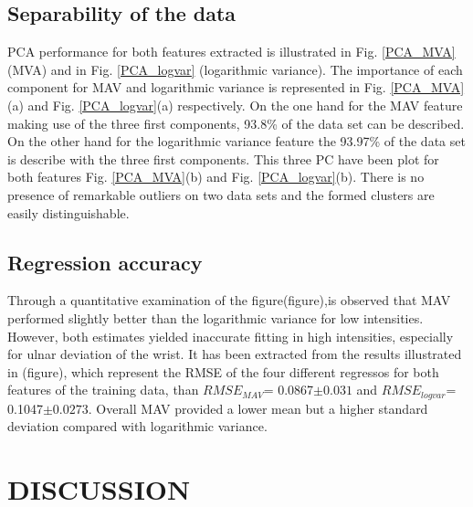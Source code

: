 \documentclass[a4paper, 10pt, conference]{ieeeconf}      %
\begin{document}
	\subsection{Separability of the data} 
	PCA performance for both features extracted is illustrated in Fig. \ref{PCA_MVA} (MVA) and in Fig. \ref{PCA_logvar} (logarithmic variance).
	The importance of each component for MAV and logarithmic variance is represented in Fig. \ref{PCA_MVA}(a) and Fig. \ref{PCA_logvar}(a) respectively. On the one hand for the MAV feature making use of the three first components, 93.8\% of the data set can be described. On the other hand for the logarithmic variance feature the 93.97\% of the data set is describe with the three first components. This three PC have been plot for both features Fig. \ref{PCA_MVA}(b) and Fig. \ref{PCA_logvar}(b). There is no presence of remarkable outliers on two data sets and the formed clusters are easily distinguishable.


	\subsection{Regression accuracy} 
Through a quantitative examination of the figure(figure),is observed that MAV performed slightly better than the logarithmic variance for low intensities. However, both estimates yielded inaccurate fitting in high intensities, especially for ulnar deviation of the wrist. It has been extracted from the results illustrated in (figure), which represent the RMSE of the four different regressos for both features of the training data, than $RMSE_{MAV}$= 0.0867$\pm 0.031$ and $RMSE_{logvar}$= 0.1047$\pm 0.0273$. Overall MAV provided a lower mean but a higher standard deviation compared with logarithmic variance.



	\section{DISCUSSION}
	
	
	
	
\end{document}
